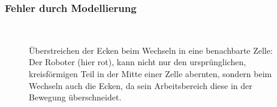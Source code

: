 \documentclass{article}
\begin{document}
\subsubsection{Fehler durch Modellierung}

\begin{figure}[!ht]
  \centering
   \qquad
  \\
   \qquad
  \caption{Überstreichen der Ecken beim Wechseln in eine benachbarte Zelle: Der Roboter (hier rot),
  kann nicht nur den ursprünglichen, kreisförmigen Teil in der Mitte einer Zelle abernten, 
  sondern beim Wechseln auch die Ecken, da sein Arbeitsbereich diese in der Bewegung überschneidet. }
  \label{fig:harvested_edges}
\end{figure}
\end{document}
